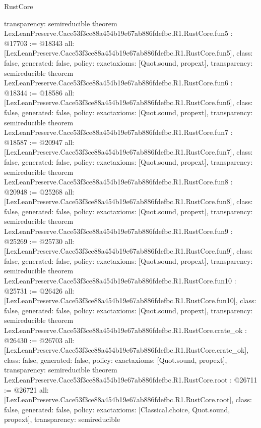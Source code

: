 \begin{lexlean}{RustCore}
\begin{coremodule}
{  transparency: semireducible
}
theorem LexLeanPreserve.Cace53f3ce88a454b19e67ab886fdefbc.R1.RustCore.fun5 : @17703 := @18343 {
  all: [LexLeanPreserve.Cace53f3ce88a454b19e67ab886fdefbc.R1.RustCore.fun5],
  class: false,
  generated: false,
  policy: exact{axioms: [Quot.sound, propext]},
  transparency: semireducible
}
theorem LexLeanPreserve.Cace53f3ce88a454b19e67ab886fdefbc.R1.RustCore.fun6 : @18344 := @18586 {
  all: [LexLeanPreserve.Cace53f3ce88a454b19e67ab886fdefbc.R1.RustCore.fun6],
  class: false,
  generated: false,
  policy: exact{axioms: [Quot.sound, propext]},
  transparency: semireducible
}
theorem LexLeanPreserve.Cace53f3ce88a454b19e67ab886fdefbc.R1.RustCore.fun7 : @18587 := @20947 {
  all: [LexLeanPreserve.Cace53f3ce88a454b19e67ab886fdefbc.R1.RustCore.fun7],
  class: false,
  generated: false,
  policy: exact{axioms: [Quot.sound, propext]},
  transparency: semireducible
}
theorem LexLeanPreserve.Cace53f3ce88a454b19e67ab886fdefbc.R1.RustCore.fun8 : @20948 := @25268 {
  all: [LexLeanPreserve.Cace53f3ce88a454b19e67ab886fdefbc.R1.RustCore.fun8],
  class: false,
  generated: false,
  policy: exact{axioms: [Quot.sound, propext]},
  transparency: semireducible
}
theorem LexLeanPreserve.Cace53f3ce88a454b19e67ab886fdefbc.R1.RustCore.fun9 : @25269 := @25730 {
  all: [LexLeanPreserve.Cace53f3ce88a454b19e67ab886fdefbc.R1.RustCore.fun9],
  class: false,
  generated: false,
  policy: exact{axioms: [Quot.sound, propext]},
  transparency: semireducible
}
theorem LexLeanPreserve.Cace53f3ce88a454b19e67ab886fdefbc.R1.RustCore.fun10 : @25731 := @26426 {
  all: [LexLeanPreserve.Cace53f3ce88a454b19e67ab886fdefbc.R1.RustCore.fun10],
  class: false,
  generated: false,
  policy: exact{axioms: [Quot.sound, propext]},
  transparency: semireducible
}
theorem LexLeanPreserve.Cace53f3ce88a454b19e67ab886fdefbc.R1.RustCore.crate_ok : @26430 := @26703 {
  all: [LexLeanPreserve.Cace53f3ce88a454b19e67ab886fdefbc.R1.RustCore.crate_ok],
  class: false,
  generated: false,
  policy: exact{axioms: [Quot.sound, propext]},
  transparency: semireducible
}
theorem LexLeanPreserve.Cace53f3ce88a454b19e67ab886fdefbc.R1.RustCore.root : @26711 := @26721 {
  all: [LexLeanPreserve.Cace53f3ce88a454b19e67ab886fdefbc.R1.RustCore.root],
  class: false,
  generated: false,
  policy: exact{axioms: [Classical.choice, Quot.sound, propext]},
  transparency: semireducible
}


\end{coremodule}
\end{lexlean}
